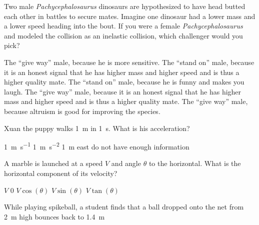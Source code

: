 \documentclass[exam,addpoints, noanswers]{exam}
\begin{document}
\begin{questions}
\question[5] Two male \emph{\dag Pachycephalosaurus} dinosaurs are hypothesized to have head butted each other in battles to secure mates.  Imagine one dinosaur had a lower mass and a lower speed heading into the bout. If you were a female \emph{\dag Pachycephalosaurus} and modeled the collision as an inelastic collision, which challenger would you pick?
\begin{choices}
\choice The ``give way'' male, because he is more sensitive. 
\CorrectChoice The ``stand on'' male, because it is an honest signal that he has higher mass and higher speed and is thus a higher quality mate.
\choice The ``stand on'' male, because he is funny and makes you laugh. 
\choice The ``give way'' male, because it is an honest signal that he has higher mass and higher speed and is thus a higher quality mate.
\choice The ``give way'' male, because altruism is good for improving the species. 
\end{choices}

\question[5] Xuan the puppy walks \SI{1}{\meter} in \SI{1}{\second}. What is his acceleration? 
\begin{choices}
\choice \SI{1}{\meter\per\second}
\choice \SI{1}{\meter\per\second\squared}
\choice \SI{1}{\meter} east
\CorrectChoice do not have enough information
\end{choices}

\question[5]  A marble is launched at a speed $V$ and angle $\theta$ to the horizontal. What is the horizontal component of its velocity? 
\begin{choices}
\choice $V$
\choice $0$
\CorrectChoice $V\cos(\theta)$
\choice $V\sin(\theta)$
\choice $V\tan(\theta)$
\end{choices}




\clearpage
\question While playing spikeball, a student finds that a ball dropped onto the net from \SI{2}{\meter} high bounces back to \SI{1.4}{\meter}
\end{questions}
\end{document}
